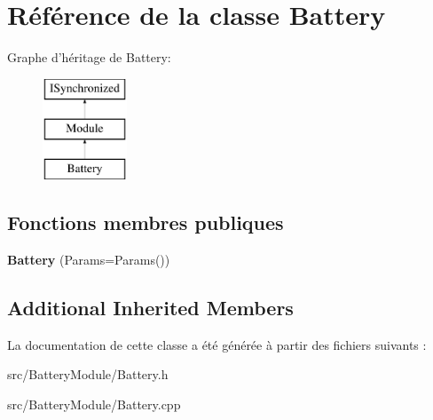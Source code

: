 \hypertarget{classBattery}{\section{Référence de la classe Battery}
\label{classBattery}
}
Graphe d'héritage de Battery\-:\begin{figure}[H]
\begin{center}
\leavevmode
\includegraphics[height=3.000000cm]{classBattery}
\end{center}
\end{figure}
\subsection*{Fonctions membres publiques}
\begin{DoxyCompactItemize}
\item 
\hypertarget{classBattery_a2d41baf862c216d64f7455934422431b}{{\bfseries Battery} (Params=Params())}\label{classBattery_a2d41baf862c216d64f7455934422431b}

\end{DoxyCompactItemize}
\subsection*{Additional Inherited Members}


La documentation de cette classe a été générée à partir des fichiers suivants \-:\begin{DoxyCompactItemize}
\item 
src/\-Battery\-Module/Battery.\-h\item 
src/\-Battery\-Module/Battery.\-cpp\end{DoxyCompactItemize}
